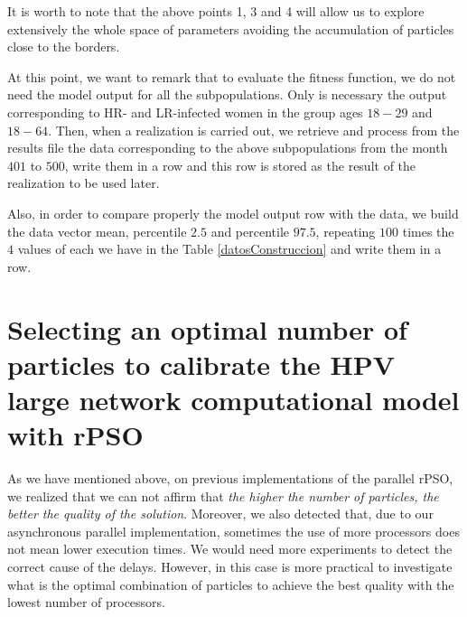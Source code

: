 It is worth to note that the above points 1, 3 and 4 will allow us to explore extensively the whole space of parameters avoiding the accumulation of particles close to the borders. 

\begin{remark}\label{mo}
At this point, we want to remark that to evaluate the fitness function, we do not need the model output for all the subpopulations. Only is necessary the output corresponding to HR- and LR-infected women in the group ages $18-29$ and $18-64$. Then, when a realization is carried out, we retrieve and process from the results file the data corresponding to the above subpopulations from the month $401$ to $500$, write them in a row and this row is stored as the result of the realization to be used later. 

Also, in order to compare properly the model output row with the data, we build the data vector mean, percentile $2.5$ and percentile $97.5$, repeating $100$ times the $4$ values of each we have in the Table \ref{datosConstruccion} and write them in a row.
\end{remark}

\section{Selecting an optimal number of particles to calibrate the HPV large network computational model with rPSO}
As we have mentioned above, on previous implementations of the parallel rPSO, we realized that we can not affirm that \textit{the higher the number of particles, the better the quality of the solution}. Moreover, we also detected that, due to our asynchronous parallel implementation, sometimes the use of more processors does not mean lower execution times. We would need more experiments to detect the correct cause of the delays. However, in this case is more practical to investigate what is the optimal combination of particles to achieve the best quality with the lowest number of processors.

